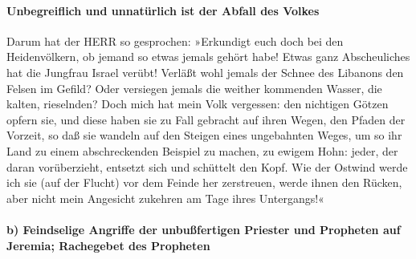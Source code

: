 \hypertarget{unbegreiflich-und-unnatuxfcrlich-ist-der-abfall-des-volkes}{%
\paragraph{Unbegreiflich und unnatürlich ist der Abfall des
Volkes}\label{unbegreiflich-und-unnatuxfcrlich-ist-der-abfall-des-volkes}}

Darum hat der HERR so gesprochen: »Erkundigt euch doch
bei den Heidenvölkern, ob jemand so etwas jemals gehört habe! Etwas ganz
Abscheuliches hat die Jungfrau Israel verübt! Verläßt
wohl jemals der Schnee des Libanons den Felsen im Gefild? Oder versiegen
jemals die weither kommenden Wasser, die kalten, rieselnden?
Doch mich hat mein Volk vergessen: den nichtigen Götzen
opfern sie, und diese haben sie zu Fall gebracht auf ihren Wegen, den
Pfaden der Vorzeit, so daß sie wandeln auf den Steigen eines ungebahnten
Weges, um so ihr Land zu einem abschreckenden Beispiel zu
machen, zu ewigem Hohn: jeder, der daran vorüberzieht, entsetzt sich und
schüttelt den Kopf. Wie der Ostwind werde ich sie (auf
der Flucht) vor dem Feinde her zerstreuen, werde ihnen den Rücken, aber
nicht mein Angesicht zukehren am Tage ihres Untergangs!«

\hypertarget{b-feindselige-angriffe-der-unbuuxdffertigen-priester-und-propheten-auf-jeremia-rachegebet-des-propheten}{%
\paragraph{b) Feindselige Angriffe der unbußfertigen Priester und
Propheten auf Jeremia; Rachegebet des
Propheten}\label{b-feindselige-angriffe-der-unbuuxdffertigen-priester-und-propheten-auf-jeremia-rachegebet-des-propheten}}

